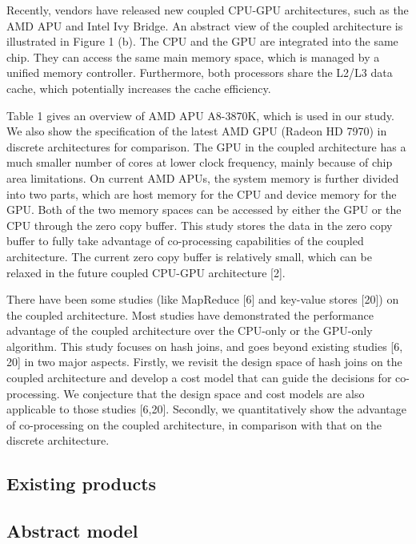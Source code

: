 Recently, vendors have released new coupled CPU-GPU architectures, such as the AMD APU and Intel Ivy Bridge. An abstract view of the coupled architecture is illustrated in Figure 1 (b). The CPU and the GPU are integrated into the same chip. They can access the same main memory space, which is managed by a unified memory controller. Furthermore, both processors share the L2/L3 data cache, which potentially increases the cache efficiency.

Table 1 gives an overview of AMD APU A8-3870K, which is used in our study. We also show the specification of the latest AMD GPU (Radeon HD 7970) in discrete architectures for comparison. The GPU in the coupled architecture has a much smaller number of cores at lower clock frequency, mainly because of chip area limitations. On current AMD APUs, the system memory is further divided into two parts, which are host memory for the CPU and device memory for the GPU. Both of the two memory spaces can be accessed by either the GPU or the CPU through the zero copy buffer. This study stores the data in the zero copy buffer to fully take advantage of co-processing capabilities of the coupled architecture. The current zero copy buffer is relatively small, which can be relaxed in the future coupled CPU-GPU architecture [2].

There have been some studies (like MapReduce [6] and key-value stores [20]) on the coupled architecture. Most studies have demonstrated the performance advantage of the coupled architecture over the CPU-only or the GPU-only algorithm. This study focuses on hash joins, and goes beyond existing studies [6, 20] in two major aspects. Firstly, we revisit the design space of hash joins on the coupled architecture and develop a cost model that can guide the decisions for co-processing. We conjecture that the design space and cost models are also applicable to those studies [6,20]. Secondly, we quantitatively show the advantage of co-processing on the coupled architecture, in comparison with that on the discrete architecture.

\subsection{Existing products}

\subsection{Abstract model}
